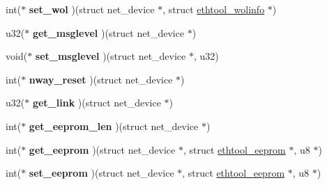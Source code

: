 \begin{DoxyCompactItemize}
\item 
\hypertarget{struct__kc__ethtool__ops_a89ca24112efc6dffbd3e91569f32268d}{
int($\ast$ {\bfseries set\_\-wol} )(struct net\_\-device $\ast$, struct \hyperlink{structethtool__wolinfo}{ethtool\_\-wolinfo} $\ast$)}
\label{struct__kc__ethtool__ops_a89ca24112efc6dffbd3e91569f32268d}

\item 
\hypertarget{struct__kc__ethtool__ops_a52d9edde25e02750918d19418f066d86}{
u32($\ast$ {\bfseries get\_\-msglevel} )(struct net\_\-device $\ast$)}
\label{struct__kc__ethtool__ops_a52d9edde25e02750918d19418f066d86}

\item 
\hypertarget{struct__kc__ethtool__ops_aec19740541d44363d3a56941d0e96a80}{
void($\ast$ {\bfseries set\_\-msglevel} )(struct net\_\-device $\ast$, u32)}
\label{struct__kc__ethtool__ops_aec19740541d44363d3a56941d0e96a80}

\item 
\hypertarget{struct__kc__ethtool__ops_a0cd8875db2bd6a3c834aa3fa2172db9b}{
int($\ast$ {\bfseries nway\_\-reset} )(struct net\_\-device $\ast$)}
\label{struct__kc__ethtool__ops_a0cd8875db2bd6a3c834aa3fa2172db9b}

\item 
\hypertarget{struct__kc__ethtool__ops_a40888f52f1b72b5405789211b550663f}{
u32($\ast$ {\bfseries get\_\-link} )(struct net\_\-device $\ast$)}
\label{struct__kc__ethtool__ops_a40888f52f1b72b5405789211b550663f}

\item 
\hypertarget{struct__kc__ethtool__ops_af8f591a1ef118af7aade93315d3cda3c}{
int($\ast$ {\bfseries get\_\-eeprom\_\-len} )(struct net\_\-device $\ast$)}
\label{struct__kc__ethtool__ops_af8f591a1ef118af7aade93315d3cda3c}

\item 
\hypertarget{struct__kc__ethtool__ops_af6a14d80a76ec9dfc31c99f95e6f849b}{
int($\ast$ {\bfseries get\_\-eeprom} )(struct net\_\-device $\ast$, struct \hyperlink{structethtool__eeprom}{ethtool\_\-eeprom} $\ast$, u8 $\ast$)}
\label{struct__kc__ethtool__ops_af6a14d80a76ec9dfc31c99f95e6f849b}

\item 
\hypertarget{struct__kc__ethtool__ops_ae0a1e1d6d3cfda7e9c8cb9e95cc7350b}{
int($\ast$ {\bfseries set\_\-eeprom} )(struct net\_\-device $\ast$, struct \hyperlink{structethtool__eeprom}{ethtool\_\-eeprom} $\ast$, u8 $\ast$)}
\label{struct__kc__ethtool__ops_ae0a1e1d6d3cfda7e9c8cb9e95cc7350b}


\end{DoxyCompactItemize}
